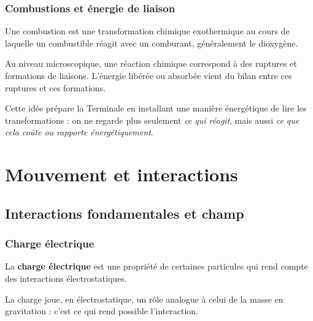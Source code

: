 \documentclass[11pt,a4paper]{article}
\begin{document}
\subsubsection{Combustions et énergie de liaison}

\begin{definitionbox}
Une combustion est une transformation chimique exothermique au cours de laquelle un combustible réagit avec un comburant, généralement le dioxygène.
\end{definitionbox}

\begin{sensbox}
Au niveau microscopique, une réaction chimique correspond à des ruptures et formations de liaisons.  
L'énergie libérée ou absorbée vient du bilan entre ces ruptures et ces formations.
\end{sensbox}

\begin{terminalebox}
Cette idée prépare la Terminale en installant une manière énergétique de lire les transformations : on ne regarde plus seulement \emph{ce qui réagit}, mais aussi \emph{ce que cela coûte ou rapporte énergétiquement}.
\end{terminalebox}

\newpage

\section{Mouvement et interactions}

\subsection{Interactions fondamentales et champ}

\subsubsection{Charge électrique}

\begin{definitionbox}
La \textbf{charge électrique} est une propriété de certaines particules qui rend compte des interactions électrostatiques.
\end{definitionbox}

\begin{sensbox}
La charge joue, en électrostatique, un rôle analogue à celui de la masse en gravitation : c'est ce qui rend possible l'interaction.
\end{sensbox}
\end{document}
